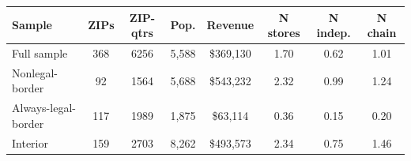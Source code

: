 \begin{tabular}{@{}lccccccc@{}}
\toprule
Sample & ZIPs & ZIP-qtrs & Pop. & Revenue & N stores & N indep. & N chain \\
\midrule
Full sample & 368 & 6256 & 5,588 & \$369,130 & 1.70 & 0.62 & 1.01 \\
Nonlegal-border & 92 & 1564 & 5,688 & \$543,232 & 2.32 & 0.99 & 1.24 \\
Always-legal-border & 117 & 1989 & 1,875 & \$63,114 & 0.36 & 0.15 & 0.20 \\
Interior & 159 & 2703 & 8,262 & \$493,573 & 2.34 & 0.75 & 1.46 \\
\bottomrule
\end{tabular}
